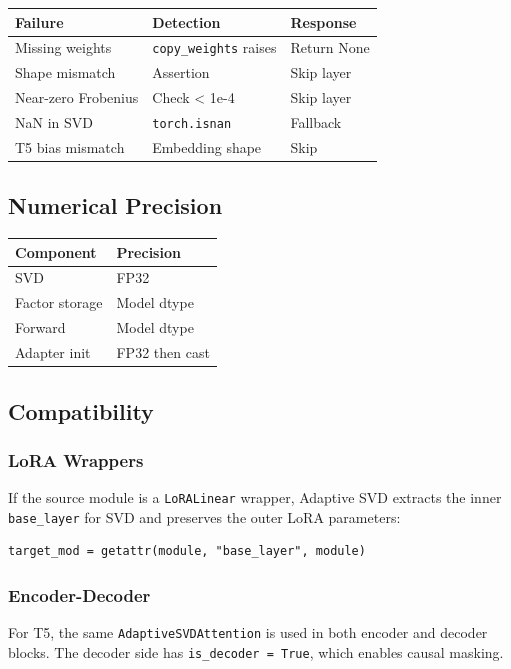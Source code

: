 \begin{table}[H]
\centering
\small
\begin{tabular}{lll}
\toprule
\textbf{Failure} & \textbf{Detection} & \textbf{Response} \\
\midrule
Missing weights & \texttt{copy\_weights} raises & Return None \\
Shape mismatch & Assertion & Skip layer \\
Near-zero Frobenius & Check < 1e-4 & Skip layer \\
NaN in SVD & \texttt{torch.isnan} & Fallback \\
T5 bias mismatch & Embedding shape & Skip \\
\bottomrule
\end{tabular}
\end{table}

\subsection{Numerical Precision}

\begin{table}[H]
\centering
\small
\begin{tabular}{ll}
\toprule
\textbf{Component} & \textbf{Precision} \\
\midrule
SVD & FP32 \\
Factor storage & Model dtype \\
Forward & Model dtype \\
Adapter init & FP32 then cast \\
\bottomrule
\end{tabular}
\end{table}

\subsection{Compatibility}

\subsubsection{LoRA Wrappers}

If the source module is a \texttt{LoRALinear} wrapper, Adaptive SVD extracts the 
inner \texttt{base\_layer} for SVD and preserves the outer LoRA parameters:

\begin{lstlisting}
target_mod = getattr(module, "base_layer", module)
\end{lstlisting}

\subsubsection{Encoder-Decoder}

For T5, the same \texttt{AdaptiveSVDAttention} is used in both encoder and decoder 
blocks. The decoder side has \texttt{is\_decoder = True}, which enables causal masking.